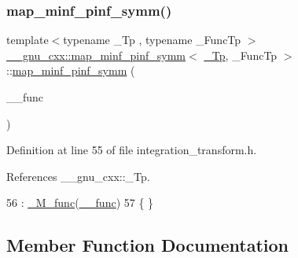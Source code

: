\subsubsection{\texorpdfstring{map\+\_\+minf\+\_\+pinf\+\_\+symm()}{map\_minf\_pinf\_symm()}}
{\footnotesize\ttfamily template$<$typename \+\_\+\+Tp , typename \+\_\+\+Func\+Tp $>$ \\
\hyperlink{struct____gnu__cxx_1_1map__minf__pinf__symm}{\+\_\+\+\_\+gnu\+\_\+cxx\+::map\+\_\+minf\+\_\+pinf\+\_\+symm}$<$ \hyperlink{namespace____gnu__cxx_a3b19a9c800ca194374ef9172290f7d79}{\+\_\+\+Tp}, \+\_\+\+Func\+Tp $>$\+::\hyperlink{struct____gnu__cxx_1_1map__minf__pinf__symm}{map\+\_\+minf\+\_\+pinf\+\_\+symm} (\begin{DoxyParamCaption}\item[{\+\_\+\+Func\+Tp}]{\+\_\+\+\_\+func }\end{DoxyParamCaption})\hspace{0.3cm}{\ttfamily [inline]}}



Definition at line 55 of file integration\+\_\+transform.\+h.



References \+\_\+\+\_\+gnu\+\_\+cxx\+::\+\_\+\+Tp.


\begin{DoxyCode}
56       : \hyperlink{struct____gnu__cxx_1_1map__minf__pinf__symm_a3e6d1d72fb8471f11573dc8b6ce835c6}{\_M\_func}(\hyperlink{namespace____gnu__cxx_af2b2f0c7a2ae72b922b1afefae5a65b2}{\_\_func})
57       \{ \}
\end{DoxyCode}


\subsection{Member Function Documentation}
\mbox{\label{struct____gnu__cxx_1_1map__minf__pinf__symm_a9814773879a6ccd8379237161697dfe8}} 
